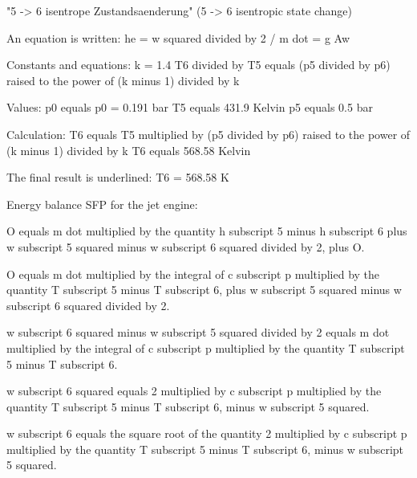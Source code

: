 "5 -> 6 isentrope Zustandsaenderung"  
(5 -> 6 isentropic state change)  

An equation is written:  
he = w squared divided by 2 / m dot = g Aw  

Constants and equations:  
k = 1.4  
T6 divided by T5 equals (p5 divided by p6) raised to the power of (k minus 1) divided by k  

Values:  
p0 equals p0 = 0.191 bar  
T5 equals 431.9 Kelvin  
p5 equals 0.5 bar  

Calculation:  
T6 equals T5 multiplied by (p5 divided by p6) raised to the power of (k minus 1) divided by k  
T6 equals 568.58 Kelvin  

The final result is underlined:  
T6 = 568.58 K

Energy balance SFP for the jet engine:  

O equals m dot multiplied by the quantity h subscript 5 minus h subscript 6 plus w subscript 5 squared minus w subscript 6 squared divided by 2, plus O.  

O equals m dot multiplied by the integral of c subscript p multiplied by the quantity T subscript 5 minus T subscript 6, plus w subscript 5 squared minus w subscript 6 squared divided by 2.  

w subscript 6 squared minus w subscript 5 squared divided by 2 equals m dot multiplied by the integral of c subscript p multiplied by the quantity T subscript 5 minus T subscript 6.  

w subscript 6 squared equals 2 multiplied by c subscript p multiplied by the quantity T subscript 5 minus T subscript 6, minus w subscript 5 squared.  

w subscript 6 equals the square root of the quantity 2 multiplied by c subscript p multiplied by the quantity T subscript 5 minus T subscript 6, minus w subscript 5 squared.